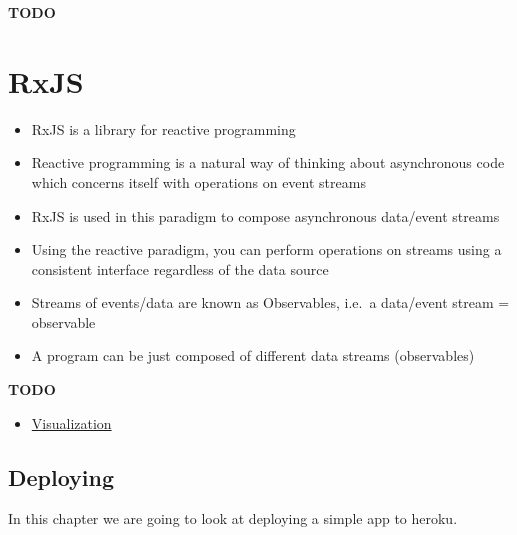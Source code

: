 \documentclass[12pt,]{article}
\providecommand{\tightlist}{%
  \setlength{\itemsep}{0pt}\setlength{\parskip}{0pt}}
\begin{document}
\textbf{TODO}

\section{RxJS}\label{rxjs}

\begin{itemize}
\tightlist
\item
  RxJS is a library for reactive programming
\item
  Reactive programming is a natural way of thinking about asynchronous
  code which concerns itself with operations on event streams
\item
  RxJS is used in this paradigm to compose asynchronous data/event
  streams
\item
  Using the reactive paradigm, you can perform operations on streams
  using a consistent interface regardless of the data source
\item
  Streams of events/data are known as Observables, i.e.~a data/event
  stream = observable
\item
  A program can be just composed of different data streams (observables)
\end{itemize}

\textbf{TODO}

\begin{itemize}
\tightlist
\item
  \href{http://rxmarbles.com/}{Visualization}
\end{itemize}

\subsection{Deploying}\label{deploying}

In this chapter we are going to look at deploying a simple app to
heroku.
\end{document}
